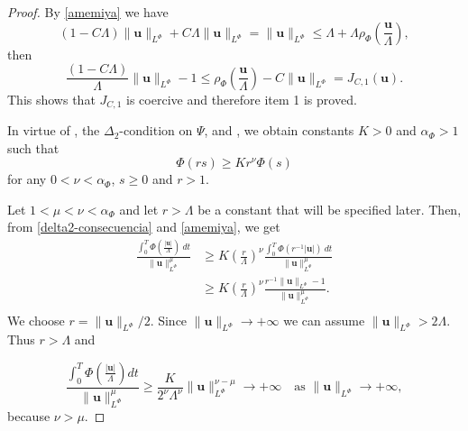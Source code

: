 \documentclass[twoside]{article}
\theoremstyle{remark}
\newcommand{\orlnor}{\|_{L^{\Phi}}}
\renewcommand{\b}[1]{\boldsymbol{#1}}
\renewcommand{\leq}{\leqslant}
\begin{document}
\begin{proof} By \eqref{amemiya} we have
\[(1-C\Lambda)\|\b{u}\orlnor+C\Lambda\|\b{u}\orlnor=\|\b{u}\orlnor\leq \Lambda +\Lambda \rho_{\Phi}\left(\frac{\b{u}}{\Lambda}\right),\]
then
\[\frac{(1-C\Lambda)}{\Lambda}\|\b{u}\orlnor-1\leq \rho_{\Phi}\left(\frac{\b{u}}{\Lambda}\right)- C\|\b{u}\orlnor=J_{C,1}(\b{u}).\]
This shows that $J_{C,1}$ is coercive and therefore item 1 is proved.  

In virtue of \cite[Eq. (2.8)]{AGMS}, the $\Delta_2$-condition on $\Psi$, \cite[Thm. 11.7]{M} and \cite[Cor. 11.6]{M}, we obtain constants $K>0$ and $\alpha_{\Phi}>1$ such that 
\begin{equation}\label{delta2-consecuencia}
\Phi(r s)\geq Kr^{\nu}\Phi(s)
\end{equation}
for any $0<\nu<\alpha_{\Phi}$,  $s\geq 0$ and $r>1$.

Let $1<\mu<\nu<\alpha_{\Phi}$ and let $r>\Lambda$ be a constant that will be specified later.  
Then, from \eqref{delta2-consecuencia} and \eqref{amemiya}, we get
\[
\begin{split}
\frac{\int_0^T \Phi\left(\frac{|\b{u}|}{\Lambda}\right)\ dt}{\|\b{u}\orlnor^{\mu}}
&\geq
K \left(\frac{r}{\Lambda}\right)^{\nu}\frac{\int_0^T \Phi(r^{-1}|\b{u}|)\ dt}{\|\b{u}\orlnor^{\mu}}\\
&\geq
K \left(\frac{r}{\Lambda}\right)^{\nu}\frac{r^{-1}\|\b{u}\orlnor-1}{\|\b{u}\orlnor^{\mu}}.\\
\end{split}
\]
We choose $r=\|\b{u}\orlnor/2$. Since $\|\b{u}\orlnor\to+\infty$   we can assume $\|\b{u}\orlnor>2\Lambda$.  Thus $r>\Lambda$ and 

\[
\frac{\int_0^T \Phi\left(\frac{|\b{u}|}{\Lambda}\right) dt}{\|\b{u}\orlnor^{\mu}}\geq
\frac{K}{2^{\nu}\Lambda^{\nu}} \|\b{u}\orlnor^{\nu-\mu}\to +\infty\quad\text{as }\|\b{u}\orlnor\to+\infty,
\]
because $\nu>\mu$.


\end{proof}
\end{document}
